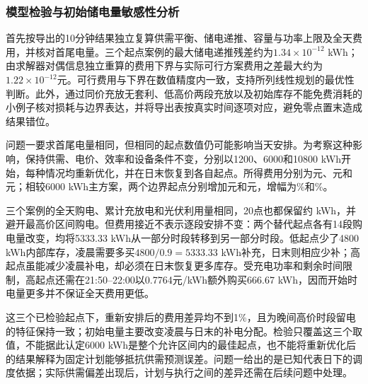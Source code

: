 \subsubsection{模型检验与初始储电量敏感性分析}
首先按导出的10分钟结果独立复算供需平衡、储电递推、容量与功率上限及全天费用，并核对首尾电量。三个起点案例的最大储电递推残差约为$1.34\times10^{-12}$ kWh；由求解器对偶信息独立重算的费用下界与实际可行方案费用之差最大约为$1.22\times10^{-12}$元。可行费用与下界在数值精度内一致，支持所列线性规划的最优性判断。此外，通过同价充放无套利、低高价两段充放以及初始库存不能免费消耗的小例子核对损耗与边界表达，并将导出表按真实时间逐项对应，避免零点置末造成结果错位。

问题一要求首尾电量相同，但相同的起点数值仍可能影响当天安排。为考察这种影响，保持供需、电价、效率和设备条件不变，分别以1200、6000和10800 kWh开始，每种情况均重新优化，并在日末恢复到各自起点。所得费用分别为\LowInitialCost{}元、\MainCost{}元和\HighInitialCost{}元；相较6000 kWh主方案，两个边界起点分别增加\LowInitialDelta{}元和\HighInitialDelta{}元，增幅为\LowInitialPct{}\%和\HighInitialPct{}\%。

三个案例的全天购电、累计充放电和光伏利用量相同，20点也都保留约\EveningState{} kWh，并避开最高价区间购电。但费用接近不表示逐段安排不变：两个替代起点各有14段购电量改变，均将5333.33 kWh从一部分时段转移到另一部分时段。低起点少了4800 kWh内部库存，凌晨需要多买$4800/0.9=5333.33$ kWh补充，日末则相应少补；高起点虽能减少凌晨补电，却必须在日末恢复更多库存。受充电功率和剩余时间限制，高起点还需在21:50--22:00以0.7764元/kWh额外购买666.67 kWh，因而开始时电量更多并不保证全天费用更低。

这三个已检验起点下，重新安排后的费用差异均不到1\%，且为晚间高价时段留电的特征保持一致；初始电量主要改变凌晨与日末的补电分配。检验只覆盖这三个取值，不能据此认定6000 kWh是整个允许区间内的最佳起点，也不能将重新优化后的结果解释为固定计划能够抵抗供需预测误差。问题一给出的是已知代表日下的调度依据；实际供需偏差出现后，计划与执行之间的差异还需在后续问题中处理。
